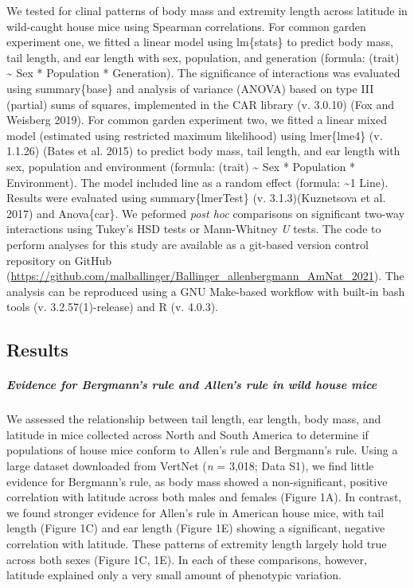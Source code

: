 \documentclass[]{article}
\let\oldsubparagraph\subparagraph
\renewcommand{\subparagraph}[1]{\oldsubparagraph{#1}\mbox{}}
\begin{document}
We tested for clinal patterns of body mass and extremity length across
latitude in wild-caught house mice using Spearman correlations. For
common garden experiment one, we fitted a linear model using lm\{stats\}
to predict body mass, tail length, and ear length with sex, population,
and generation (formula: (trait) \textasciitilde{} Sex * Population *
Generation). The significance of interactions was evaluated using
summary\{base\} and analysis of variance (ANOVA) based on type III
(partial) sums of squares, implemented in the CAR library (v. 3.0.10)
(Fox and Weisberg 2019). For common garden experiment two, we fitted a
linear mixed model (estimated using restricted maximum likelihood) using
lmer\{lme4\} (v. 1.1.26) (Bates et al. 2015) to predict body mass, tail
length, and ear length with sex, population and environment (formula:
(trait) \textasciitilde{} Sex * Population * Environment). The model
included line as a random effect (formula: \textasciitilde{}1 \textbar{}
Line). Results were evaluated using summary\{lmerTest\} (v.
3.1.3)(Kuznetsova et al. 2017) and Anova\{car\}. We peformed \emph{post
hoc} comparisons on significant two-way interactions using Tukey's HSD
tests or Mann-Whitney \emph{U} tests. The code to perform analyses for
this study are available as a git-based version control repository on
GitHub
(\url{https://github.com/malballinger/Ballinger_allenbergmann_AmNat_2021}).
The analysis can be reproduced using a GNU Make-based workflow with
built-in bash tools (v. 3.2.57(1)-release) and R (v. 4.0.3).

\vspace{5mm}

\hypertarget{results}{%
\subsection{Results}\label{results}}

\hypertarget{evidence-for-bergmanns-rule-and-allens-rule-in-wild-house-mice}{%
\subparagraph{\texorpdfstring{\emph{Evidence for Bergmann's rule and
Allen's rule in wild house
mice}}{Evidence for Bergmann's rule and Allen's rule in wild house mice}}\label{evidence-for-bergmanns-rule-and-allens-rule-in-wild-house-mice}}

We assessed the relationship between tail length, ear length, body mass,
and latitude in mice collected across North and South America to
determine if populations of house mice conform to Allen's rule and
Bergmann's rule. Using a large dataset downloaded from VertNet (\emph{n}
= 3,018; Data S1), we find little evidence for Bergmann's rule, as body
mass showed a non-significant, positive correlation with latitude across
both males and females (Figure 1A). In contrast, we found stronger
evidence for Allen's rule in American house mice, with tail length
(Figure 1C) and ear length (Figure 1E) showing a significant, negative
correlation with latitude. These patterns of extremity length largely
hold true across both sexes (Figure 1C, 1E). In each of these
comparisons, however, latitude explained only a very small amount of
phenotypic variation.
\end{document}
